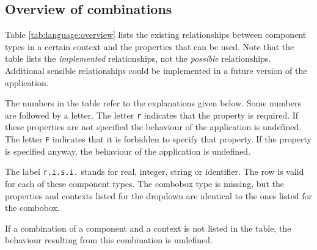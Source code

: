 \subsection{Overview of combinations}
Table \ref{tab:language:overview} lists the existing relationships between
component types in a certain context and the properties that can be used. Note
that the table lists the \emph{implemented} relationships, not the
\emph{possible} relationships. Additional sensible relationships could be
implemented in a future version of the application.

The numbers in the table refer to the explanations given below. Some numbers
are followed by a letter. The letter \texttt{r} indicates that the property is
required. If these properties are not specified the behaviour of the
application is undefined. The letter \texttt{F} indicates that it is forbidden
to specify that property. If the property is specified anyway, the behaviour of
the application is undefined.

The label \texttt{r.i.s.i.} stands for real, integer, string or identifier. The
row is valid for each of these component types. The combobox type is missing,
but the properties and contexts listed for the dropdown are identical to the
ones listed for the combobox.

If a combination of a component and a context is not listed in the table, the
behaviour resulting from this combination is undefined.

